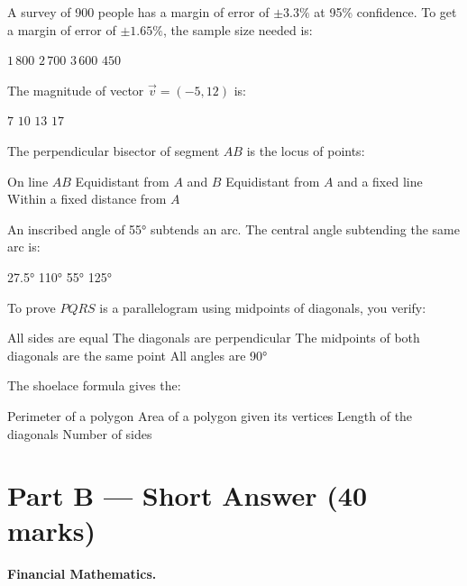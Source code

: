\documentclass[addpoints]{exam}
\begin{document}
\begin{questions}
\question[1] A survey of 900 people has a margin of error of $\pm 3.3\%$ at 95\% confidence.
To get a margin of error of $\pm 1.65\%$, the sample size needed is:
\begin{choices}
    \choice $1\,800$
    \choice $2\,700$
    \correctchoice $3\,600$
    \choice $450$
\end{choices}

\question[1] The magnitude of vector $\vec{v} = (-5, 12)$ is:
\begin{choices}
    \choice $7$
    \choice $10$
    \correctchoice $13$
    \choice $17$
\end{choices}

\question[1] The perpendicular bisector of segment $AB$ is the locus of points:
\begin{choices}
    \choice On line $AB$
    \correctchoice Equidistant from $A$ and $B$
    \choice Equidistant from $A$ and a fixed line
    \choice Within a fixed distance from $A$
\end{choices}

\question[1] An inscribed angle of \ang{55} subtends an arc. The central angle subtending
the same arc is:
\begin{choices}
    \choice \ang{27.5}
    \correctchoice \ang{110}
    \choice \ang{55}
    \choice \ang{125}
\end{choices}

\question[1] To prove $PQRS$ is a parallelogram using midpoints of diagonals, you verify:
\begin{choices}
    \choice All sides are equal
    \choice The diagonals are perpendicular
    \correctchoice The midpoints of both diagonals are the same point
    \choice All angles are \ang{90}
\end{choices}

\question[1] The shoelace formula gives the:
\begin{choices}
    \choice Perimeter of a polygon
    \correctchoice Area of a polygon given its vertices
    \choice Length of the diagonals
    \choice Number of sides
\end{choices}


\section*{Part B --- Short Answer (40 marks)}

\question[8] \textbf{Financial Mathematics.}
\end{questions}
\end{document}
